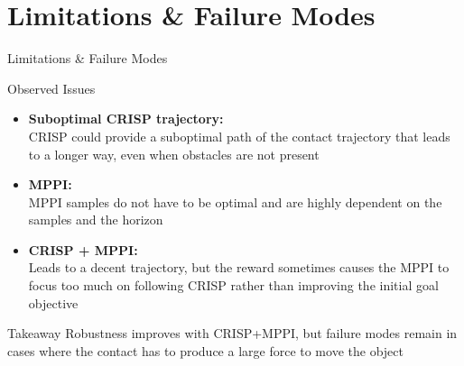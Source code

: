 \documentclass[10pt, aspectratio=169]{beamer}
\begin{document}
\section{Limitations \& Failure Modes}
\begin{frame}{Limitations \& Failure Modes}
  \begin{block}{Observed Issues}
    \begin{itemize}
      \item \textbf{Suboptimal CRISP trajectory:}  \\
            CRISP could provide a suboptimal path of the contact trajectory that leads to a longer way, even when obstacles are not present
      \item \textbf{MPPI:} \\ 
            MPPI samples do not have to be optimal and are highly dependent on the samples and the horizon
      \item \textbf{CRISP + MPPI:} \\
            Leads to a decent trajectory, but the reward sometimes causes the MPPI to focus too much on following CRISP rather than improving the initial goal objective
    \end{itemize}
  \end{block}

  \vspace{0.5em}

  \begin{block}{Takeaway}
    Robustness improves with CRISP+MPPI, but failure modes remain in cases where the contact has to produce a large force to move the object
  \end{block}
\end{frame}

\end{document}
